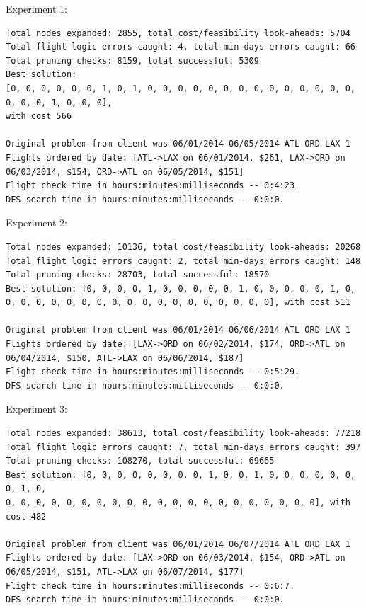 \documentclass{article}
\begin{document}
Experiment 1:

\scriptsize
\begin{verbatim}
Total nodes expanded: 2855, total cost/feasibility look-aheads: 5704
Total flight logic errors caught: 4, total min-days errors caught: 66
Total pruning checks: 8159, total successful: 5309
Best solution:
[0, 0, 0, 0, 0, 0, 1, 0, 1, 0, 0, 0, 0, 0, 0, 0, 0, 0, 0, 0, 0, 0, 0, 0, 0, 0, 1, 0, 0, 0],
with cost 566

Original problem from client was 06/01/2014 06/05/2014 ATL ORD LAX 1
Flights ordered by date: [ATL->LAX on 06/01/2014, $261, LAX->ORD on 06/03/2014, $154, ORD->ATL on 06/05/2014, $151]
Flight check time in hours:minutes:milliseconds -- 0:4:23.
DFS search time in hours:minutes:milliseconds -- 0:0:0.
\end{verbatim}
\normalsize

Experiment 2:

\scriptsize
\begin{verbatim}
Total nodes expanded: 10136, total cost/feasibility look-aheads: 20268
Total flight logic errors caught: 2, total min-days errors caught: 148
Total pruning checks: 28703, total successful: 18570
Best solution: [0, 0, 0, 0, 1, 0, 0, 0, 0, 0, 1, 0, 0, 0, 0, 0, 1, 0,
0, 0, 0, 0, 0, 0, 0, 0, 0, 0, 0, 0, 0, 0, 0, 0, 0, 0], with cost 511

Original problem from client was 06/01/2014 06/06/2014 ATL ORD LAX 1
Flights ordered by date: [LAX->ORD on 06/02/2014, $174, ORD->ATL on 06/04/2014, $150, ATL->LAX on 06/06/2014, $187]
Flight check time in hours:minutes:milliseconds -- 0:5:29.
DFS search time in hours:minutes:milliseconds -- 0:0:0.
\end{verbatim}
\normalsize

Experiment 3:

\scriptsize
\begin{verbatim}
Total nodes expanded: 38613, total cost/feasibility look-aheads: 77218
Total flight logic errors caught: 7, total min-days errors caught: 397
Total pruning checks: 108270, total successful: 69665
Best solution: [0, 0, 0, 0, 0, 0, 0, 0, 1, 0, 0, 1, 0, 0, 0, 0, 0, 0, 0, 1, 0,
0, 0, 0, 0, 0, 0, 0, 0, 0, 0, 0, 0, 0, 0, 0, 0, 0, 0, 0, 0, 0], with cost 482

Original problem from client was 06/01/2014 06/07/2014 ATL ORD LAX 1
Flights ordered by date: [LAX->ORD on 06/03/2014, $154, ORD->ATL on 06/05/2014, $151, ATL->LAX on 06/07/2014, $177]
Flight check time in hours:minutes:milliseconds -- 0:6:7.
DFS search time in hours:minutes:milliseconds -- 0:0:0.
\end{verbatim}
\normalsize
\end{document}
